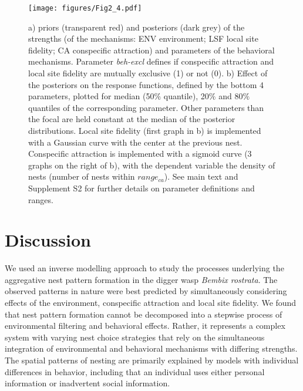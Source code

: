 \documentclass[10pt, twoside]{book} %
\begin{document}
	\begin{figure}[h!]
		\begin{center}
			\texttt{[image: figures/Fig2\_4.pdf]}
		\end{center}
		\begin{footnotesize}
			\caption{a) priors (transparent red) and posteriors (dark grey) of the strengths (of the mechanisms: ENV environment; LSF local site fidelity; CA conspecific attraction) and parameters of the behavioral mechanisms. Parameter \textit{beh-excl} defines if conspecific attraction and local site fidelity are mutually exclusive (1) or not (0). b) Effect of the posteriors on the response functions, defined by the bottom 4 parameters, plotted for median (50$\%$ quantile), 20$\%$ and 80$\%$ quantiles of the corresponding parameter. Other parameters than the focal are held constant at the median of the posterior distributions. Local site fidelity (first graph in b) is implemented with a Gaussian curve with the center at the previous nest. Conspecific attraction is implemented with a sigmoid curve (3 graphs on the right of b), with the dependent variable the density of nests (number of nests within $range_{ca}$). See main text and Supplement S2 for further details on parameter definitions and ranges. \label{fig2.4}}
		\end{footnotesize}
	\end{figure}
	

\clearpage	
	
	\section{Discussion}
	We used an inverse modelling approach to study the processes underlying the aggregative nest pattern formation in the digger wasp \textit{Bembix rostrata}. The observed patterns in nature were best predicted by simultaneously considering effects of the environment, conspecific attraction and local site fidelity. We found that nest pattern formation cannot be decomposed into a stepwise process of environmental filtering and behavioral effects. Rather, it represents a complex system with varying nest choice strategies that rely on the simultaneous integration of environmental and behavioral mechanisms with differing strengths. The spatial patterns of nesting are primarily explained by models with individual differences in behavior, including that an individual uses either personal information or inadvertent social information.\\
	
\end{document}
